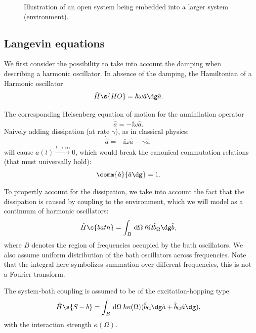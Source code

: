 \documentclass[fontsize=9pt,bookmarkpackage=false]{scrartcl}
\renewcommand{\hbar}{\hslash}
\newcommand{\inputtikz}[1]{%
  \tikzsetnextfilename{#1}%
}
\begin{document}
\begin{figure}[htb]
  \centering
  \inputtikz{open_systems}
  \caption{Illustration of an open system being embedded into a larger system (environment).}
  \label{fig:opensys}
\end{figure}

\subsection{Langevin equations} %
\label{sec:langevin_equations}

We first consider the possibility to take into account the damping when describing a harmonic oscillator.
In absence of the damping, the Hamiltonian of a Harmonic oscillator
\begin{equation}
  \hat H\s{HO} = \hbar \omega \hat a \dg \hat a.
\end{equation}

The corresponding Heisenberg equation of motion for the annihilation operator
\begin{equation}
  \dot{ \hat a } = - \ii \omega \hat a.
\end{equation}
Naively adding dissipation (at rate $\gamma$), as in classical physics:
\begin{equation}
  \dot{ \hat a } = - \ii \omega \hat a - \gamma \hat a,
\end{equation}
will cause $a(t ) \stackrel{ t \to \infty }{ \to } 0$, which would break the canonical commutation relations (that must universally hold):
\begin{equation}
  \comm{ \hat a }{ \hat a\dg } = 1.
\end{equation}

To propertly account for the dissipation, we take into account the fact that the dissipation is caused by coupling to the environment, which we will model as a continuum of harmonic oscillators:
\begin{equation}
  \hat H\s{bath} = \int_B \dl{ \Omega} \: \hbar \Omega \hat b_\Omega\dg \hat b,
\end{equation}
where $B$ denotes the region of frequencies occupied by the bath oscillators.
We also assume uniform distribution of the bath oscillators across frequencies.
Note that the integral here symbolizes summation over different frequencies, this is not a Fourier transform.

The system-bath coupling is assumed to be of the excitation-hopping type
\begin{equation}
  \hat H\s{S-b} =  \int_B \dl{ \Omega} \: \hbar \kappa( \Omega )
  ( \hat b_\Omega\dg \hat a + \hat b_\Omega \hat a \dg ),
\end{equation}
with the interaction strength $\kappa (\Omega)$.
\end{document}
